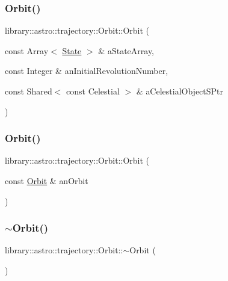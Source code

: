 \subsubsection{\texorpdfstring{Orbit()}{Orbit()}\hspace{0.1cm}{\footnotesize\ttfamily [2/3]}}
{\footnotesize\ttfamily library\+::astro\+::trajectory\+::\+Orbit\+::\+Orbit (\begin{DoxyParamCaption}\item[{const Array$<$ \hyperlink{classlibrary_1_1astro_1_1trajectory_1_1_state}{State} $>$ \&}]{a\+State\+Array,  }\item[{const Integer \&}]{an\+Initial\+Revolution\+Number,  }\item[{const Shared$<$ const Celestial $>$ \&}]{a\+Celestial\+Object\+S\+Ptr }\end{DoxyParamCaption})}

\mbox{\label{classlibrary_1_1astro_1_1trajectory_1_1_orbit_abf3190fc9317ab9b927c2de0bfadad49}} 
\subsubsection{\texorpdfstring{Orbit()}{Orbit()}\hspace{0.1cm}{\footnotesize\ttfamily [3/3]}}
{\footnotesize\ttfamily library\+::astro\+::trajectory\+::\+Orbit\+::\+Orbit (\begin{DoxyParamCaption}\item[{const \hyperlink{classlibrary_1_1astro_1_1trajectory_1_1_orbit}{Orbit} \&}]{an\+Orbit }\end{DoxyParamCaption})}

\mbox{\label{classlibrary_1_1astro_1_1trajectory_1_1_orbit_a6408656107990a10c28329cac3786809}} 
\subsubsection{\texorpdfstring{$\sim$\+Orbit()}{~Orbit()}}
{\footnotesize\ttfamily library\+::astro\+::trajectory\+::\+Orbit\+::$\sim$\+Orbit (\begin{DoxyParamCaption}{ }\end{DoxyParamCaption})}



